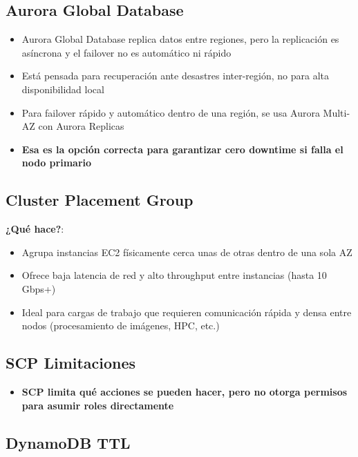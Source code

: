\documentclass[12pt,a4paper]{report}
\newcommand{\important}[1]{\textcolor{dangerred}{\textbf{#1}}}
\begin{document}
\subsection{Aurora Global Database}

\begin{itemize}
    \item Aurora Global Database replica datos entre regiones, pero la replicación es asíncrona y el failover no es automático ni rápido
    \item Está pensada para recuperación ante desastres inter-región, no para alta disponibilidad local
    \item Para failover rápido y automático dentro de una región, se usa Aurora Multi-AZ con Aurora Replicas
    \item \important{Esa es la opción correcta para garantizar cero downtime si falla el nodo primario}
\end{itemize}

\subsection{Cluster Placement Group}

\textbf{¿Qué hace?}:
\begin{itemize}
    \item Agrupa instancias EC2 físicamente cerca unas de otras dentro de una sola AZ
    \item Ofrece baja latencia de red y alto throughput entre instancias (hasta 10 Gbps+)
    \item Ideal para cargas de trabajo que requieren comunicación rápida y densa entre nodos (procesamiento de imágenes, HPC, etc.)
\end{itemize}

\subsection{SCP Limitaciones}

\begin{itemize}
    \item \important{SCP limita qué acciones se pueden hacer, pero no otorga permisos para asumir roles directamente}
\end{itemize}

\subsection{DynamoDB TTL}
\end{document}
